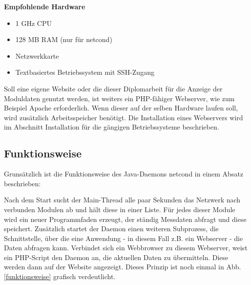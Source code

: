 \documentclass[a4paper,14pt,headsepline]{scrartcl}
\begin{document}
\textbf{Empfohlende Hardware}

\begin{itemize}
	\item 1 GHz CPU
	\item 128 MB RAM (nur für netcond)
	\item Netzwerkkarte
	\item Textbasiertes Betriebssystem mit SSH-Zugang
\end{itemize}

Soll eine eigene Website oder die dieser Diplomarbeit für die Anzeige der Moduldaten genutzt werden, ist weiters ein PHP-fähiger Webserver, wie zum Beispiel Apache erforderlich. Wenn dieser auf der selben Hardware laufen soll, wird zusätzlich Arbeitsspeicher benötigt. Die Installation eines Webservers wird im Abschnitt Installation für die gängigen Betriebssysteme beschrieben. 

\newpage

\subsection{Funktionsweise}

Grunsätzlich ist die Funktionsweise des Java-Daemons netcond in einem Absatz beschrieben:

Nach dem Start sucht der Main-Thread alle paar Sekunden das Netzwerk nach verbunden Modulen ab und hält diese in einer Liste. Für jedes dieser Module wird ein neuer Programmfaden erzeugt, der ständig Messdaten abfragt und diese speichert. Zusätzlich startet der Daemon einen weiteren Subprozess, die Schnittstelle, über die eine Anwendung - in diesem Fall z.B. ein Webserver - die Daten abfragen kann. Verbindet sich ein Webbrowser zu diesem Webserver, weist ein PHP-Script den Daemon an, die aktuellen Daten zu übermitteln. Diese werden dann auf der Website angezeigt. Dieses Prinzip ist noch einmal in Abb. \ref{funktionsweise} grafisch verdeutlicht.
\end{document}
